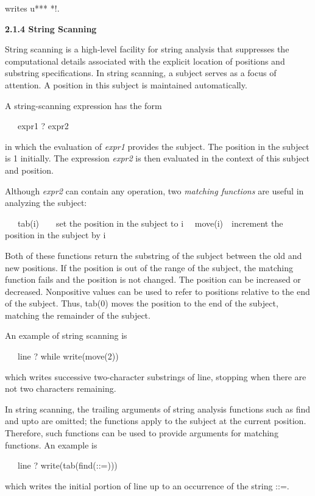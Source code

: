 \noindent
writes u*{\textbar}**{\textbar} {\textbar}{\textbar}*{\textbar}{\textbar}!.

{\sffamily\bfseries
2.1.4 String Scanning}

String scanning is a high-level facility for string analysis that
suppresses the computational details associated with the explicit
location of positions and substring specifications. In string
scanning, a subject serves as a focus of attention. A position in this
subject is maintained automatically.


A string-scanning expression has the form

{\ttfamily\mdseries
\ \ \ expr1 ? expr2}

\noindent in which the evaluation of \textit{expr1} provides the
subject. The position in the subject is 1 initially. The expression
\textit{expr2} is then evaluated in the context of this subject and
position.


Although \textit{expr2} can contain any operation, two
\textit{matching functions} are useful in analyzing the subject:


\ \ \ tab(i)\ \ \ \ set the position in the subject to i\newline
 \ \ move(i)\ \ increment the position in the subject by i


Both of these functions return the substring of the subject between
the old and new positions. If the position is out of the range of the
subject, the matching function fails and the position is not
changed. The position can be increased or decreased. Nonpositive
values can be used to refer to positions relative to the end of the
subject. Thus, tab(0) moves the position to the end of the subject,
matching the remainder of the subject.


An example of string scanning is

{\ttfamily\mdseries
\ \ \ line ? while write(move(2))}

\noindent which writes successive two-character substrings of line,
stopping when there are not two characters remaining.

In string scanning, the trailing arguments of string analysis
functions such as find and upto are omitted; the functions apply to
the subject at the current position. Therefore, such functions can be
used to provide arguments for matching functions. An example is

{\ttfamily\mdseries
\ \ \ line ? write(tab(find({\textquotedbl}::={\textquotedbl})))}

\noindent which writes the initial portion of line up to an occurrence
of the string {\textquotedbl}::={\textquotedbl}.

